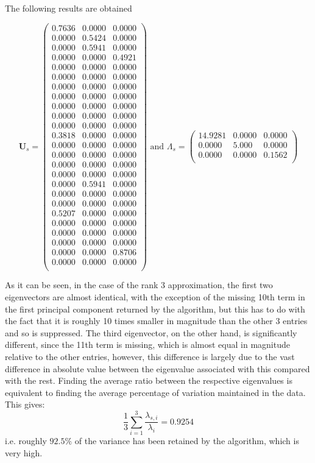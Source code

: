 \documentclass[11pt,a4paper]{article}
\begin{document}
The following results are obtained 

\begin{equation*}
\mathbf{U}_s= \begin{pmatrix}
0.7636&0.0000&0.0000\\
0.0000&0.5424&0.0000\\
0.0000&0.5941&0.0000\\
0.0000&0.0000&0.4921\\
0.0000&0.0000&0.0000\\
0.0000&0.0000&0.0000\\
0.0000&0.0000&0.0000\\
0.0000&0.0000&0.0000\\
0.0000&0.0000&0.0000\\
0.0000&0.0000&0.0000\\
0.0000&0.0000&0.0000\\
0.3818&0.0000&0.0000\\
0.0000&0.0000&0.0000\\
0.0000&0.0000&0.0000\\
0.0000&0.0000&0.0000\\
0.0000&0.0000&0.0000\\
0.0000&0.5941&0.0000\\
0.0000&0.0000&0.0000\\
0.0000&0.0000&0.0000\\
0.5207&0.0000&0.0000\\
0.0000&0.0000&0.0000\\
0.0000&0.0000&0.0000\\
0.0000&0.0000&0.0000\\
0.0000&0.0000&0.8706\\
0.0000&0.0000&0.0000\\
\end{pmatrix} \text{   and   }
\Lambda_s = \begin{pmatrix}
14.9281 & 0.0000&0.0000\\
0.0000 & 5.000& 0.0000\\
0.0000&0.0000&0.1562\\
\end{pmatrix}
\end{equation*}

As it can be seen, in the case of the rank 3 approximation, the first two eigenvectors are almost identical, with the exception of the missing 10th term in the first principal component returned by the algorithm, but this has to do with the fact that it is roughly 10 times smaller in magnitude than the other 3 entries and so is suppressed. The third eigenvector, on the other hand, is significantly different, since the 11th term is missing, which is almost equal in magnitude relative to the other entries, however, this difference is largely due to the vast difference in absolute value between the eigenvalue associated with this compared with the rest. Finding the average ratio between the respective eigenvalues is equivalent to finding the average percentage of variation maintained in the data. This gives:
\begin{equation*}
\frac{1}{3}\sum_{i=1}^3 \frac{\lambda_{s, i}}{\lambda_i} = 0.9254
\end{equation*}
i.e. roughly $92.5\%$ of the variance has been retained by the algorithm, which is very high. 
\end{document}
